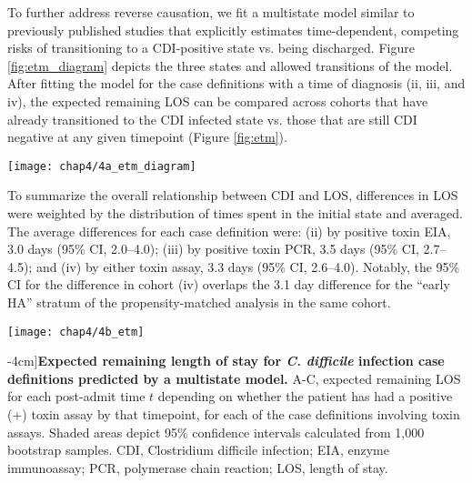 To further address reverse causation, we fit a multistate model similar to previously published studies\autocite{Mitchell2014,Stevens2015,VanKleef2014} that explicitly estimates time-dependent, competing risks of transitioning to a CDI-positive state vs. being discharged. Figure \ref{fig:etm_diagram} depicts the three states and allowed transitions of the model. After fitting the model for the case definitions with a time of diagnosis (ii, iii, and iv), the expected remaining LOS can be compared across cohorts that have already transitioned to the CDI infected state vs. those that are still CDI negative at any given timepoint (Figure \ref{fig:etm}).
\begin{marginfigure}
  \texttt{[image: chap4/4a\_etm\_diagram]}               
  \caption[Multistate model of \emph{C. difficile} infection]{\textbf{Multistate model of \emph{C. difficile} infection.} Three states of the multistate model and allowed transitions. Patients may only transition in the direction of the arrows.}
  \label{fig:etm_diagram}
\end{marginfigure}
To summarize the overall relationship between CDI and LOS, differences in LOS were weighted by the distribution of times spent in the initial state and averaged. The average differences for each case definition were: (ii) by positive toxin EIA, 3.0 days (95\% CI, 2.0–4.0); (iii) by positive toxin PCR, 3.5 days (95\% CI, 2.7–4.5); and (iv) by either toxin assay, 3.3 days (95\% CI, 2.6–4.0). Notably, the 95\% CI for the difference in cohort (iv) overlaps the 3.1 day difference for the “early HA” stratum of the propensity-matched analysis in the same cohort.

\begin{figure*}[htb]
  \centering
  \texttt{[image: chap4/4b\_etm]}
  \caption[Expected remaining length of stay for \emph{C. difficile} infection case definitions as predicted by a multistate model][-4cm]{\textbf{Expected remaining length of stay for \emph{C. difficile} infection case definitions predicted by a multistate model.} A-C, expected remaining LOS for each post-admit time $t$ depending on whether the patient has had a positive (+) toxin assay by that timepoint, for each of the case definitions involving toxin assays. Shaded areas depict 95\% confidence intervals calculated from 1,000 bootstrap samples. CDI, Clostridium difficile infection; EIA, enzyme immunoassay; PCR, polymerase chain reaction; LOS, length of stay.
  }
  \label{fig:etm}
\end{figure*}

